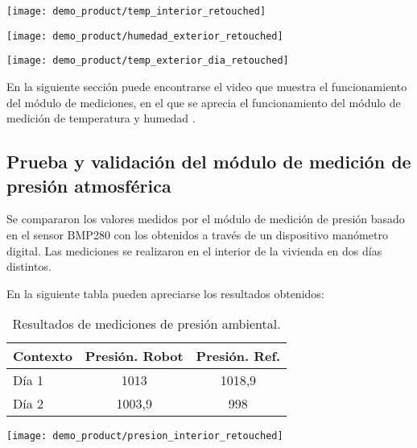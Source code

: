 \begin{center}
\texttt{[image: demo\_product/temp\_interior\_retouched]}
  \label{fig:temp_interior_retouched}
\end{center}


\begin{center}
\texttt{[image: demo\_product/humedad\_exterior\_retouched]}
  \label{fig:humedad_exterior_retouched}
\end{center}

\begin{center}
\texttt{[image: demo\_product/temp\_exterior\_dia\_retouched]}
  \label{fig:temp_exterior_dia_retouched}
\end{center}


En la siguiente sección puede encontrarse el video que muestra el funcionamiento del módulo de mediciones, en el que se aprecia el funcionamiento del módulo de medición de temperatura y humedad \cite{Demo_Mediciones}.

\subsection{Prueba y validación del módulo de medición de presión atmosférica}

Se compararon los valores medidos por el módulo de medición de presión basado en el sensor BMP280 con los obtenidos a través de un dispositivo manómetro digital. Las mediciones se realizaron en el interior de la vivienda en dos días distintos.

En la siguiente tabla pueden apreciarse los resultados obtenidos:

\begin{table}[h]
\centering
\caption[Resultados de mediciones de presión ambiental.]{Resultados de mediciones de presión ambiental.}
\begin{tabular}{l c c}
\toprule
\textbf{Contexto} & \textbf{Presión. Robot} & \textbf{Presión. Ref.} \\
\midrule
Día 1 & 1013 & 1018,9 \\
Día 2 & 1003,9 & 998 \\
\bottomrule
\hline
\end{tabular}
\end{table}

\begin{center}
\texttt{[image: demo\_product/presion\_interior\_retouched]}
  \label{fig:presion_interior_retouched}
\end{center}

